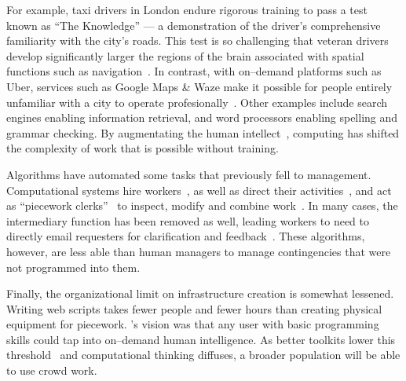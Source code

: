 \documentclass[trackingWork]{subfiles}
\begin{document}
For example, taxi drivers in London endure rigorous training to pass a test known as ``The Knowledge''
--- a demonstration of the driver's comprehensive familiarity with the city's roads.
This test is so challenging that veteran drivers develop significantly larger
the regions of the brain associated with spatial functions such as navigation~\cite{Maguire11042000,Maguire2894,Skok:1999:KML:299513.299625,
      skok2000managing,Woollett1407,woollett2011acquiring}.
In contrast, with on--demand platforms such as Uber, services such as Google Maps \& Waze make it possible for
people entirely unfamiliar with a city
to operate profesionally~\cite{silva2013traffic,hind2014outsmarting}.
Other examples include search engines enabling information retrieval, and word processors enabling spelling and grammar checking.
By augmentating the human intellect~\cite{engelbart2001augmenting}, computing has shifted the complexity of work that is possible without training.

Algorithms have automated some tasks that previously fell to management.
Computational systems hire workers~\cite{turkitLittle,weld2010decision}, as well as direct their activities~\cite{uberAlgorithm}, and act as ``piecework clerks''~\cite{10.2307/23702539} to inspect, modify and combine work~\cite{turkopticon,takingAHITMcInnis}.
In many cases, the intermediary function has been removed as well, leading workers to need to directly email requesters for clarification and feedback~\cite{martin2014being}.
These algorithms, however, are less able than human managers to manage contingencies that were not programmed into them.

Finally, the organizational limit on infrastructure creation is somewhat lessened. Writing web scripts takes fewer people and fewer hours than creating physical equipment for piecework.
\citeauthor{turkitLittle}'s vision was that any user with basic programming skills could tap into on--demand human intelligence.
As better toolkits lower this threshold~\cite{myers2000past} and computational thinking diffuses, a broader population will be able to use crowd work.
\end{document}
